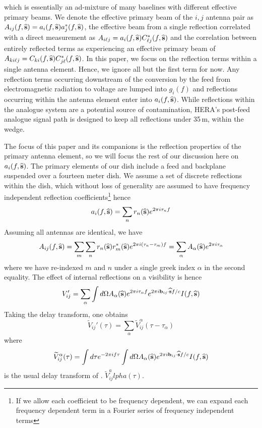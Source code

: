 \documentclass[onecolumn]{emulateapj}
\begin{document}
which is essentially an ad-mixture of many baselines with different effective primary beams. We denote the effective primary beam of the $i,j$ antenna pair as $A_{ij}(f,{\bf \widehat{s}})=a_i(f,{\bf \widehat{s}})a_j^*(f,{\bf \widehat{s}})$, the effective beam from a single reflection correlated with a direct measurement as $A_{i \ell j} = a_i(f,{\bf \widehat{s}}) C^*_{\ell j}(f,{\bf \widehat{s}})$ and the correlation between entirely reflected terms as experiencing an effective primary beam of $A_{k i \ell j}=C_{ki}(f,{\bf \widehat{s}}) C^*_{j \ell}(f,{\bf \widehat{s}})$. In this paper, we focus on the reflection terms within a single antenna element. Hence, we ignore all but the first term for now. Any reflection terms occurring downstream of the conversion by the feed from electromagnetic radiation to voltage are lumped into $g_i(f)$ and reflections occurring within the antenna element enter into $a_i(f,{\bf \widehat{s}})$. While reflections within the analogue system are a potential source of contamination, HERA's post-feed analogue signal path is designed to keep all reflections under 35\,m, within the wedge. 

The focus of this paper and its companions is the reflection properties of the primary antenna element, so we will focus the rest of our discussion here on $a_i(f,{\bf \widehat{s}})$. The primary elements of our dish include a feed and backplane suspended over a fourteen meter dish. We assume a set of discrete reflections within the dish, which without loss of generality are assumed to have frequency independent reflection coefficients\footnote{If we allow each coefficient to be frequency dependent, we can expand each frequency dependent term in a Fourier series of frequency independent terms} hence 
\begin{equation}
a_i(f,{\bf \widehat{s}}) = \sum_{n} r_n({\bf \widehat{s}}) e^{2 \pi i  \tau_n f}
\end{equation}
Assuming all antennas are identical, we have
\begin{equation}
A_{ij}(f,{\bf \widehat{s}}) = \sum_m \sum_n r_n({\bf \widehat{s}}) r_m^*({\bf \widehat{s}}) e^{2 \pi i(\tau_n-\tau_m)f} = \sum_\alpha A_\alpha({\bf \widehat{s}}) e^{2 \pi i \tau_\alpha}
\end{equation}
where we have re-indexed $m$ and $n$ under a single greek index $\alpha$ in the second equality. The effect of internal reflections on a visibility is hence
\begin{equation}
V_{ij}'= \sum_\alpha \int d \Omega A_\alpha({\bf \widehat{s}}) e^{2 \pi i \tau_\alpha f} e^{2 \pi i {\bf b}_{ij} \cdot {\bf \widehat{s}}f/c} I(f,{\bf \widehat{s}})
\end{equation}
Taking the delay transform, one obtains
\begin{equation}
\widetilde{V}_{ij}'(\tau) = \sum_\alpha \widetilde{V}_{ij}^\alpha (\tau - \tau_\alpha)
\end{equation}
where 
\begin{equation}
\widetilde{V}^\alpha_{ij}(\tau) = \int d \tau e^{-2 \pi i f \tau} \int d \Omega A_\alpha({\bf \widehat{s}}) e^{2 \pi i {\bf b}_{ij} \cdot {\bf \widehat{s}} f/c} I(f,{\bf \widehat{s}})
\end{equation}
is the usual delay transform of \citet{Parsons:2012}. $\widetilde{V}_{ij}^alpha(\tau)$.
\end{document}
